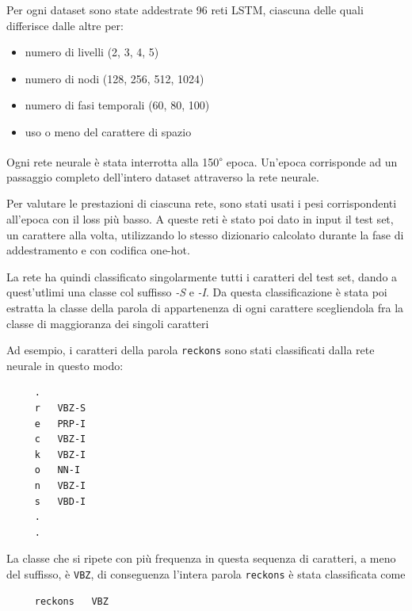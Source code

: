 Per ogni dataset sono state addestrate 96 reti LSTM, ciascuna delle quali differisce dalle altre per:

\begin{itemize}
  \item numero di livelli (2, 3, 4, 5)
  \item numero di nodi (128, 256, 512, 1024)
  \item numero di fasi temporali (60, 80, 100)
  \item uso o meno del carattere di spazio
\end{itemize}

Ogni rete neurale \`e stata interrotta alla 150\textsuperscript{$\circ$} epoca.
Un'epoca corrisponde ad un passaggio completo dell'intero dataset attraverso la rete neurale.

Per valutare le prestazioni di ciascuna rete, sono stati usati i pesi corrispondenti all'epoca con il loss pi\`u basso.
A queste reti \`e stato poi dato in input il test set, un carattere alla volta, utilizzando lo stesso dizionario calcolato durante la fase di addestramento e con codifica one-hot.

La rete ha quindi classificato singolarmente tutti i caratteri del test set, dando a quest'utlimi una classe col suffisso \emph{-S} e \emph{-I}.
Da questa classificazione \`e stata poi estratta la classe della parola di appartenenza di ogni carattere scegliendola fra la classe di maggioranza dei singoli caratteri

Ad esempio, i caratteri della parola \texttt{reckons} sono stati classificati dalla rete neurale in questo modo:

\begin{center}
  \begin{minipage}{5cm}
    \begin{verbatim}
     .
     r   VBZ-S
     e   PRP-I
     c   VBZ-I
     k   VBZ-I
     o   NN-I
     n   VBZ-I
     s   VBD-I
     .
     .
    \end{verbatim}
  \end{minipage}
\end{center}

La classe che si ripete con pi\`u frequenza in questa sequenza di caratteri, a meno del suffisso, \`e \texttt{VBZ}, di conseguenza l'intera parola \texttt{reckons} \`e stata classificata come

\begin{center}
  \begin{minipage}{5cm}
    \begin{verbatim}
     reckons   VBZ
    \end{verbatim}
  \end{minipage}
\end{center}

